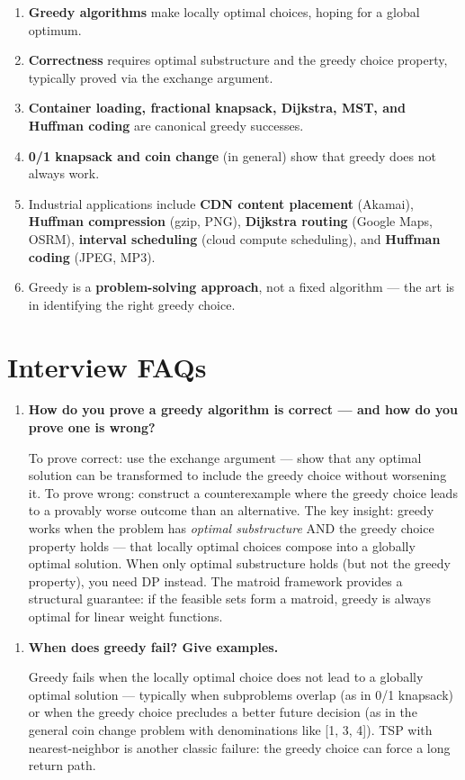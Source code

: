 \begin{enumerate}
\item \textbf{Greedy algorithms} make locally optimal choices, hoping for a global optimum.
\item \textbf{Correctness} requires optimal substructure and the greedy choice property, typically proved via the exchange argument.
\item \textbf{Container loading, fractional knapsack, Dijkstra, MST, and Huffman coding} are canonical greedy successes.
\item \textbf{0/1 knapsack and coin change} (in general) show that greedy does not always work.
\item Industrial applications include \textbf{CDN content placement} (Akamai), \textbf{Huffman compression} (gzip, PNG), \textbf{Dijkstra routing} (Google Maps, OSRM), \textbf{interval scheduling} (cloud compute scheduling), and \textbf{Huffman coding} (JPEG, MP3).
\item Greedy is a \textbf{problem-solving approach}, not a fixed algorithm — the art is in identifying the right greedy choice.
\end{enumerate}

\section{Interview FAQs}

\begin{enumerate}
\item \textbf{How do you prove a greedy algorithm is correct — and how do you prove one is wrong?}\label{faq:greedy-proof}

To prove correct: use the exchange argument — show that any optimal solution can be transformed to include the greedy choice without worsening it. To prove wrong: construct a counterexample where the greedy choice leads to a provably worse outcome than an alternative. The key insight: greedy works when the problem has \emph{optimal substructure} AND the greedy choice property holds — that locally optimal choices compose into a globally optimal solution. When only optimal substructure holds (but not the greedy property), you need DP instead. The matroid framework provides a structural guarantee: if the feasible sets form a matroid, greedy is always optimal for linear weight functions.
\end{enumerate}

\begin{enumerate}
\item \textbf{When does greedy fail? Give examples.}

Greedy fails when the locally optimal choice does not lead to a globally optimal solution — typically when subproblems overlap (as in 0/1 knapsack) or when the greedy choice precludes a better future decision (as in the general coin change problem with denominations like [1, 3, 4]). TSP with nearest-neighbor is another classic failure: the greedy choice can force a long return path.
\end{enumerate}

